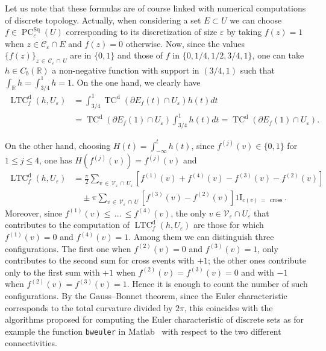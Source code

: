 \documentclass[AHL,Unicode,longabstracts,published]{cedram}
\newcommand{\R}{\mathbb{R}}
\newcommand{\ind}{{1\!\!\mathrm{I}}}
\newcommand{\eps}{\varepsilon}
\DeclareMathOperator{\TC}{TC}
\DeclareMathOperator{\LTC}{LTC}
\DeclareMathOperator{\PC}{PC}
\newcommand{\dd}{\mathrm{d}}
\DeclareMathOperator{\Sq}{Sq}
\DeclareMathOperator{\cross}{cross}
\newcommand{\calC}{\mathcal{C}}
\newcommand{\calV}{\mathcal{V}}
\begin{document}
\begin{rema}
Let us note that these formulas are of course linked with numerical computations of discrete topology. Actually, when considering a set $E\subset U$ we can choose $f\in \PC^{\Sq}_\eps(U)$ corresponding to its discretization of size $\eps$ by taking $f(z)=1$ when $z \in \calC_\eps\cap E$ and $f(z)=0$ otherwise. Now, since the values $\{f(z) \}_{z\,\in\,\calC_\eps\,\cap\,U}$ are in $\{0,1\}$ and those of $f$ in $\{0,1/4,1/2,3/4,1\}$, one can take $h\in C_b(\R)$ a non-negative function with support in $(3/4,1)$ such that $\int_{\R}h=\int_{3/4}^1h=1$. On the one hand, we clearly have
\begin{align*}
\LTC^{\dd}_f(h,U_\eps)&=\int_{3/4}^1\TC^{\dd}\left(\partial E_{f}(t)\cap U_\eps\right)h(t)dt\\
&=\TC^{\dd}\left(\partial E_{f}(1)\cap U_\eps\right)\int_{3/4}^1h(t)dt=\TC^{\dd}\left(\partial E_{f}(1) \cap U_\eps\right).
\end{align*}
\end{rema}
On the other hand, choosing $H(t)=\int_{-\infty}^th(t)$, since $f^{(j)}(v) \in \{0,1\}$ for $1\le j\le 4$, one has $H(f^{(j)}(v))=f^{(j)}(v)$ and
\begin{align*}
\LTC^{\dd}_f(h,U_\eps)&=
\frac{\pi}{2} \sum_{v\,\in\,\calV_\varepsilon\,\cap\,U_\eps} \left[f^{(1)}(v) + f^{(4)}(v)- f^{(3)}(v) - f^{(2)}(v)\right]\\
&\quad\pm \pi
\sum_{v\,\in\,\calV_\eps\,\cap\,U} \left[f^{(3)}(v) - f^{(2)}(v)\right]
\ind_{c(v)\,=\,\cross}.
\end{align*}
Moreover, since $f^{(1)}(v)\le\,\ldots\,\le f^{(4)}(v)$, the only $v\in\calV_\eps\cap U_\eps$ that contributes to the computation of $\LTC^\dd_f(h,U_\eps)$ are those for which $f^{(1)}(v)=0$ and $f^{(4)}(v)=1$. Among them we can distinguish three configurations. The first one when $f^{(2)}(v)=0$ and $f^{(3)}(v)=1$, only contributes to the second sum for cross events with $+1$; the other ones contribute only to the first sum with $+1$ when $f^{(2)}(v)=f^{(3)}(v)=0$ and with $-1$ when $f^{(2)}(v)=f^{(3)}(v)=1$. Hence it is enough to count the number of such configurations. By the Gauss--Bonnet theorem, since the Euler characteristic corresponds to the total curvature divided by $2\pi$, this coincides with the algorithms proposed for computing the Euler characteristic of discrete sets as for example the function \texttt{bweuler} in Matlab~\cite{Gray71,Pratt07} with respect to the two different connectivities.
\end{document}
